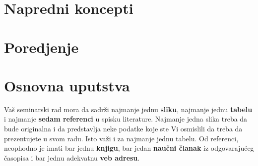 \documentclass[a4paper]{article}
\begin{document}
\section{Napredni koncepti}

\section{Poredjenje}




\section{Osnovna uputstva}
Vaš seminarski rad mora da sadrži najmanje jednu \textbf{sliku}, najmanje jednu \textbf{tabelu} i najmanje \textbf{sedam referenci} u spisku literature. Najmanje jedna slika treba da bude originalna i da predstavlja neke podatke koje ste Vi osmislili da treba da prezentujete u svom radu. Isto važi i za najmanje jednu tabelu. 	Od referenci, neophodno je imati bar jednu \textbf{knjigu}, bar jedan \textbf{naučni članak} iz odgovarajućeg časopisa i bar jednu adekvatnu \textbf{veb adresu}. 
\end{document}
